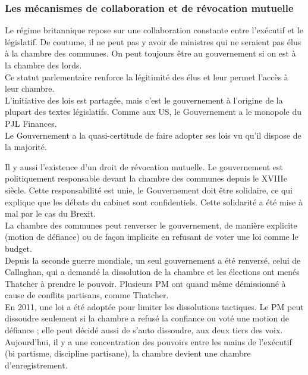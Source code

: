 \documentclass[10pt, a4paper, openany]{book}
\begin{document}
\subsubsection{Les mécanismes de collaboration et de révocation mutuelle}

Le régime britannique repose sur une collaboration constante entre l'exécutif et le législatif. De coutume, il ne peut pas y avoir de ministres qui ne seraient pas élus à la chambre des communes. On peut toujours être au gouvernement si on est à la chambre des lords. \\
Ce statut parlementaire renforce la légitimité des élus et leur permet l'accès à leur chambre. \\
L'initiative des lois est partagée, mais c'est le gouvernement à l'origine de la plupart des textes législatifs. Comme aux US, le Gouvernement a le monopole du PJL Finances. \\
Le Gouvernement a la quasi-certitude de faire adopter ses lois vu qu'il dispose de la majorité.


Il y aussi l'existence d'un droit de révocation mutuelle. Le gouvernement est politiquement responsable devant la chambre des communes depuis le XVIIIe siècle. Cette responsabilité est unie, le Gouvernement doit être solidaire, ce qui explique que les débats du cabinet sont confidentiels. Cette solidarité a été mise à mal par le cas du Brexit. \\
La chambre des communes peut renverser le gouvernement, de manière explicite (motion de défiance) ou de façon implicite en refusant de voter une loi comme le budget. \\
Depuis la seconde guerre mondiale, un seul gouvernement a été renversé, celui de Callaghan, qui a demandé la dissolution de la chambre et les élections ont menés Thatcher à prendre le pouvoir. Plusieurs PM ont quand même démissionné à cause de conflits partisans, comme Thatcher. \\
En 2011, une loi a été adoptée pour limiter les dissolutions tactiques. Le PM peut dissoudre seulement si la chambre a refusé la confiance ou voté une motion de défiance ; elle peut décidé aussi de s'auto dissoudre, aux deux tiers des voix. \\
Aujourd'hui, il y a une concentration des pouvoirs entre les mains de l'exécutif (bi partisme, discipline partisane), la chambre devient une chambre d'enregistrement. 
\end{document}
